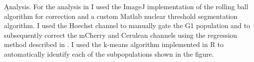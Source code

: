 \b{Analysis.}
For the analysis in  I used the ImageJ
implementation of the rolling ball algorithm for
correction and a custom Matlab nuclear threshold segmentation algorithm.
I used the Hoechst channel
to manually gate the G1 population and to subsequently
correct the mCherry and Cerulean channels using the
regression method described in
. I used
the k-means algorithm implemented in R to automatically
identify each of the subpopulations shown in the figure.


